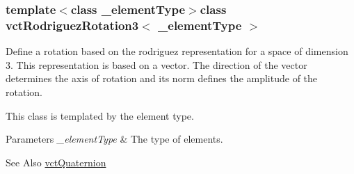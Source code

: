 \subsubsection*{template$<$class \-\_\-element\-Type$>$class vct\-Rodriguez\-Rotation3$<$ \-\_\-element\-Type $>$}

Define a rotation based on the rodriguez representation for a space of dimension 3. This representation is based on a vector. The direction of the vector determines the axis of rotation and its norm defines the amplitude of the rotation. 

This class is templated by the element type.


\begin{DoxyParams}{Parameters}
{\em \-\_\-element\-Type} & The type of elements.\\
\hline
\end{DoxyParams}
\begin{DoxySeeAlso}{See Also}
\hyperlink{classvct_quaternion}{vct\-Quaternion} 
\end{DoxySeeAlso}


